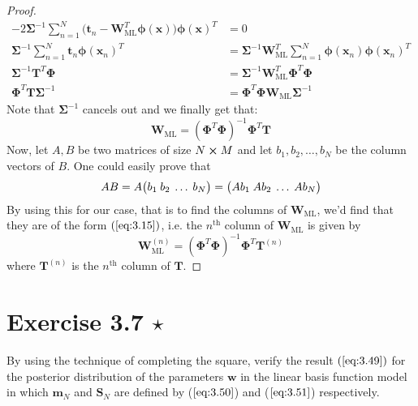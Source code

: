 \begin{proof}
\begin{align*}
            -2\mathbf{\Sigma}^{-1} \sum_{n=1}^{N} \big(\mathbf{t}_n 
            - \mathbf{W}_{\text{ML}}^T\bm{\phi}(\mathbf{x})\big) \bm{\phi}(\mathbf{x})^T 
        &= 0 \\
            \mathbf{\Sigma}^{-1} \sum_{n=1}^{N} \mathbf{t}_n \bm{\phi}(\mathbf{x}_n)^T
        &= \mathbf{\Sigma}^{-1} \mathbf{W}_{\text{ML}}^T 
            \sum_{n=1}^{N} \bm{\phi}(\mathbf{x}_n)\bm{\phi}(\mathbf{x}_n)^T \\
            \mathbf{\Sigma}^{-1} \mathbf{T}^T \mathbf{\Phi} 
        &= \mathbf{\Sigma}^{-1} \mathbf{W}_{\text{ML}}^T \mathbf{\Phi}^T\mathbf{\Phi} \\
            \mathbf{\Phi}^T\mathbf{T}\mathbf{\Sigma}^{-1}
        &= \mathbf{\Phi}^T\mathbf{\Phi}\mathbf{W}_{\text{ML}}\mathbf{\Sigma}^{-1}
    \end{align*}
    Note that $\mathbf{\Sigma}^{-1}$ cancels out and we finally get that:
     \[
         \mathbf{W}_{\text{ML}} = (\mathbf{\Phi}^T\mathbf{\Phi})^{-1} \mathbf{\Phi}^T\mathbf{T}
    \] 
    Now, let $A, B$ be two matrices of size $N \cross M$ and let $b_1, b_2, \ldots, b_N$ 
    be the column vectors of $B$. One could easily prove that
     \[
         AB = A \big(b_1 \hspace{0.25em} b_2 \hspace{0.25em} \ldots \hspace{0.25em} b_N\big)
         = \big(Ab_1 \hspace{0.25em} Ab_2 \hspace{0.25em} \ldots \hspace{0.25em} Ab_N\big)
    \] 
    By using this for our case, that is to find the columns of $\mathbf{W}_{\text{ML}}$,
    we'd find that they are of the form $(\ref{eq:3.15})$, i.e. the $n^{\text{th}}$
    column of $\mathbf{W}_{\text{ML}}$ is given by
    \[
        \mathbf{W}_{\text{ML}}^{(n)} =
        (\mathbf{\Phi}^T\mathbf{\Phi})^{-1} \mathbf{\Phi}^T\mathbf{T}^{(n)}
    \] 
    where $\mathbf{T}^{(n)}$ is the $n^{\text{th}}$ column of $\mathbf{T}$.
\end{proof}

\section*{Exercise 3.7 $\star$}
By using the technique of completing the square, verify the result $(\ref{eq:3.49})$ for
the posterior distribution of the parameters $\mathbf{w}$ in the linear basis function
model in which $\mathbf{m}_N$ and $\mathbf{S}_N$ are defined by ($\ref{eq:3.50}$) and ($\ref{eq:3.51}$) respectively.

